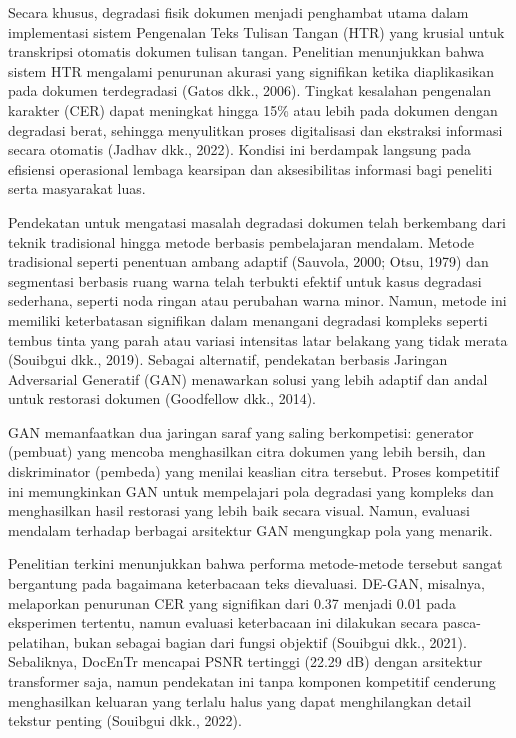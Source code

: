 \vspace{0.8em}
Secara khusus, degradasi fisik dokumen menjadi penghambat utama dalam implementasi sistem Pengenalan Teks Tulisan Tangan (HTR) yang krusial untuk transkripsi otomatis dokumen tulisan tangan. Penelitian menunjukkan bahwa sistem HTR mengalami penurunan akurasi yang signifikan ketika diaplikasikan pada dokumen terdegradasi (Gatos dkk., 2006). Tingkat kesalahan pengenalan karakter (CER) dapat meningkat hingga 15\% atau lebih pada dokumen dengan degradasi berat, sehingga menyulitkan proses digitalisasi dan ekstraksi informasi secara otomatis (Jadhav dkk., 2022). Kondisi ini berdampak langsung pada efisiensi operasional lembaga kearsipan dan aksesibilitas informasi bagi peneliti serta masyarakat luas.

\vspace{0.8em}
Pendekatan untuk mengatasi masalah degradasi dokumen telah berkembang dari teknik tradisional hingga metode berbasis pembelajaran mendalam. Metode tradisional seperti penentuan ambang adaptif (Sauvola, 2000; Otsu, 1979) dan segmentasi berbasis ruang warna telah terbukti efektif untuk kasus degradasi sederhana, seperti noda ringan atau perubahan warna minor. Namun, metode ini memiliki keterbatasan signifikan dalam menangani degradasi kompleks seperti tembus tinta yang parah atau variasi intensitas latar belakang yang tidak merata (Souibgui dkk., 2019). Sebagai alternatif, pendekatan berbasis Jaringan Adversarial Generatif (GAN) menawarkan solusi yang lebih adaptif dan andal untuk restorasi dokumen (Goodfellow dkk., 2014).

\vspace{0.8em}
GAN memanfaatkan dua jaringan saraf yang saling berkompetisi: generator (pembuat) yang mencoba menghasilkan citra dokumen yang lebih bersih, dan diskriminator (pembeda) yang menilai keaslian citra tersebut. Proses kompetitif ini memungkinkan GAN untuk mempelajari pola degradasi yang kompleks dan menghasilkan hasil restorasi yang lebih baik secara visual. Namun, evaluasi mendalam terhadap berbagai arsitektur GAN mengungkap pola yang menarik.

\vspace{0.8em}
Penelitian terkini menunjukkan bahwa performa metode-metode tersebut sangat bergantung pada bagaimana keterbacaan teks dievaluasi. DE-GAN, misalnya, melaporkan penurunan CER yang signifikan dari 0.37 menjadi 0.01 pada eksperimen tertentu, namun evaluasi keterbacaan ini dilakukan secara pasca-pelatihan, bukan sebagai bagian dari fungsi objektif (Souibgui dkk., 2021). Sebaliknya, DocEnTr mencapai PSNR tertinggi (22.29 dB) dengan arsitektur transformer saja, namun pendekatan ini tanpa komponen kompetitif cenderung menghasilkan keluaran yang terlalu halus yang dapat menghilangkan detail tekstur penting (Souibgui dkk., 2022).

